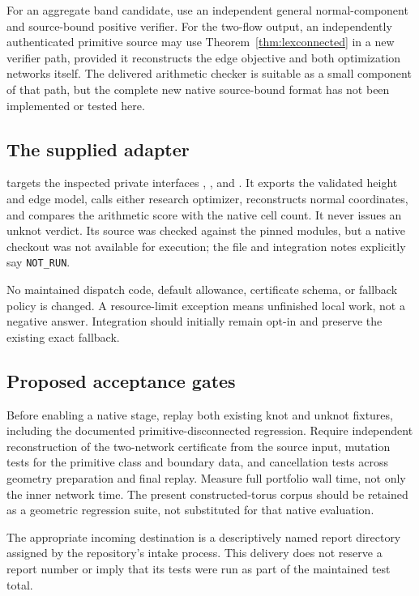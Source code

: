 \documentclass[11pt,letterpaper]{article}
\theoremstyle{definition}
\begin{document}
For an aggregate band candidate, use an independent general normal-component and source-bound positive verifier. For the two-flow output, an independently authenticated primitive source may use Theorem~\ref{thm:lexconnected} in a new verifier path, provided it reconstructs the edge objective and both optimization networks itself. The delivered arithmetic checker is suitable as a small component of that path, but the complete new native source-bound format has not been implemented or tested here.

\subsection{The supplied adapter}
 targets the inspected private interfaces
,
, and
.
It exports the validated height and edge model, calls either research optimizer, reconstructs normal coordinates, and compares the arithmetic score with the native cell count. It never issues an unknot verdict. Its source was checked against the pinned modules, but a native checkout was not available for execution; the file and integration notes explicitly say \texttt{NOT\_RUN}.

No maintained dispatch code, default allowance, certificate schema, or fallback policy is changed. A resource-limit exception means unfinished local work, not a negative answer. Integration should initially remain opt-in and preserve the existing exact fallback.

\subsection{Proposed acceptance gates}
Before enabling a native stage, replay both existing knot and unknot fixtures, including the documented primitive-disconnected regression. Require independent reconstruction of the two-network certificate from the source input, mutation tests for the primitive class and boundary data, and cancellation tests across geometry preparation and final replay. Measure full portfolio wall time, not only the inner network time. The present constructed-torus corpus should be retained as a geometric regression suite, not substituted for that native evaluation.

The appropriate incoming destination is a descriptively named report directory assigned by the repository's intake process. This delivery does not reserve a report number or imply that its tests were run as part of the maintained test total.
\end{document}
